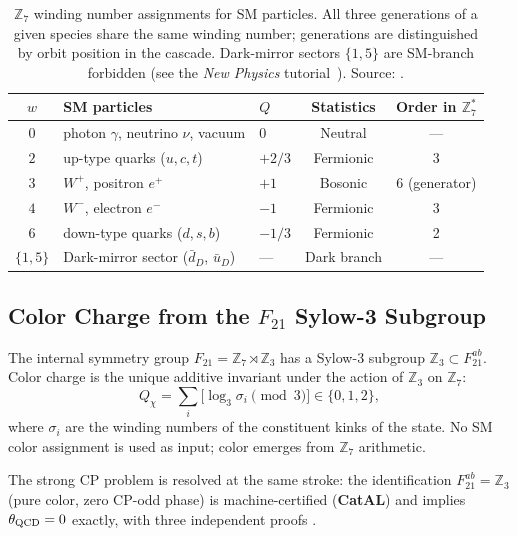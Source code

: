 \documentclass[11pt,a4paper]{article}
\newcommand{\CatAL}{\textbf{CatAL}}
\begin{document}
\begin{table}[htbp]
\centering
\caption{$\mathbb{Z}_7$ winding number assignments for SM particles.  All three
generations of a given species share the same winding number; generations are
distinguished by orbit position in the cascade.  Dark-mirror sectors $\{1,5\}$
are SM-branch forbidden (see the \emph{New Physics} tutorial~\cite{SpivackTutorialNewPhysics}).
Source: \cite{SpivackGTECompleteFramework}.}
\label{tab:winding}
\setlength{\tabcolsep}{5pt}
\begin{tabular}{cllcc}
\toprule
$w$ & SM particles & $Q$ & Statistics & Order in $\mathbb{Z}_7^*$ \\
\midrule
$0$ & photon $\gamma$, neutrino $\nu$, vacuum & $0$ & Neutral & --- \\
$2$ & up-type quarks ($u,c,t$) & $+2/3$ & Fermionic & 3 \\
$3$ & $W^+$, positron $e^+$ & $+1$ & Bosonic & 6 (generator) \\
$4$ & $W^-$, electron $e^-$ & $-1$ & Fermionic & 3 \\
$6$ & down-type quarks ($d,s,b$) & $-1/3$ & Fermionic & 2 \\
\midrule
$\{1,5\}$ & Dark-mirror sector ($\bar{d}_D$, $\bar{u}_D$) & --- & Dark branch & --- \\
\bottomrule
\end{tabular}
\end{table}

\subsection[Color Charge from the F21 Sylow-3 Subgroup]{Color Charge from the $F_{21}$ Sylow-3 Subgroup}

The internal symmetry group $F_{21} = \mathbb{Z}_7 \rtimes \mathbb{Z}_3$ has a
Sylow-3 subgroup $\mathbb{Z}_3 \subset F_{21}^{ab}$.  Color charge is the unique
additive invariant under the action of $\mathbb{Z}_3$ on $\mathbb{Z}_7$:
\begin{equation}
  Q_\chi = \sum_i \bigl[\log_3 \sigma_i \pmod{3}\bigr] \in \{0,1,2\},
\end{equation}
where $\sigma_i$ are the winding numbers of the constituent kinks of the state.
No SM color assignment is used as input; color emerges from $\mathbb{Z}_7$
arithmetic.

The strong CP problem is resolved at the same stroke: the identification
$F_{21}^{ab} = \mathbb{Z}_3$ (pure color, zero CP-odd phase) is machine-certified
(\CatAL) and implies $\theta_{\rm QCD} = 0$ exactly, with three independent
proofs \cite{SpivackGTECompleteFramework}.
\end{document}
